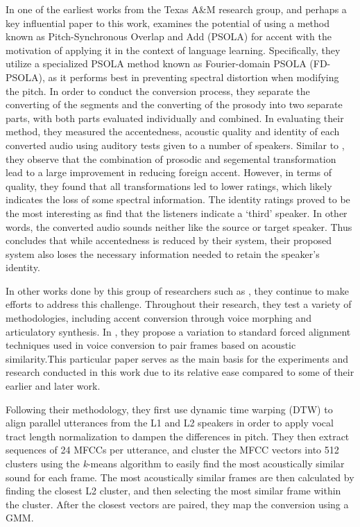 \documentclass
[
    a4paper,
    twoside,
    12pt,
]
{report}
\begin{document}
In one of the earliest works from the Texas A\&M research group, and
perhaps a key influential paper to this work, \textcite{felps2009}
examines the potential of using a method known as Pitch-Synchronous
Overlap and Add (PSOLA) for accent with the motivation of applying it in
the context of language learning. Specifically, they utilize a
specialized PSOLA method known as Fourier-domain PSOLA (FD-PSOLA), as it
performs best in preventing spectral distortion when modifying the
pitch. In order to conduct the conversion process, they separate the
converting of the segments and the converting of the prosody into two
separate parts, with both parts evaluated individually and combined. In
evaluating their method, they measured the accentedness, acoustic
quality and identity of each converted audio using auditory tests given
to a number of speakers. Similar to \textcite{huckvale2007}, they
observe that the combination of prosodic and segemental transformation
lead to a large improvement in reducing foreign accent. However, in
terms of quality, they found that all transformations led to lower
ratings, which likely indicates the loss of some spectral information.
The identity ratings proved to be the most interesting as
\textcite{felps2009} find that the listeners indicate a `third' speaker.
In other words, the converted audio sounds neither like the source or
target speaker. Thus \textcite{felps2009} concludes that while
accentedness is reduced by their system, their proposed system also
loses the necessary information needed to retain the speaker's identity.

In other works done by this group of researchers such as
\textcite{aryal2014}, they continue to make efforts to address this
challenge. Throughout their research, they test a variety of
methodologies, including accent conversion through voice morphing and
articulatory synthesis. In \textcite{aryal2014}, they propose a
variation to standard forced alignment techniques used in voice
conversion to pair frames based on acoustic similarity.This particular
paper serves as the main basis for the experiments and research
conducted in this work due to its relative ease compared to some of
their earlier and later work.

Following their methodology, they first use dynamic time warping (DTW)
to align parallel utterances from the L1 and L2 speakers in order to
apply vocal tract length normalization to dampen the differences in
pitch. They then extract sequences of 24 MFCCs per utterance, and
cluster the MFCC vectors into 512 clusters using the \textit{k}-means
algorithm to easily find the most acoustically similar sound for each
frame. The most acoustically similar frames are then calculated by
finding the closest L2 cluster, and then selecting the most similar
frame within the cluster. After the closest vectors are paired, they map
the conversion using a GMM.
\end{document}
